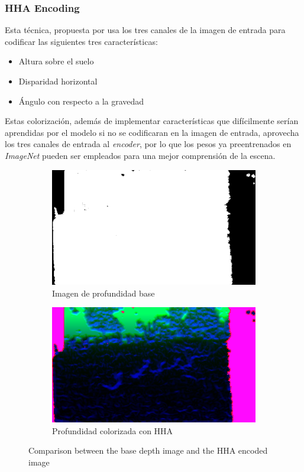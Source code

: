 \documentclass[12pt,a4paper]{report}
\begin{document}
\subsubsection{HHA Encoding}
\label{subsubsec:hha_encoding}
Esta técnica, propuesta por \cite{gupta2014learningrichfeaturesrgbd} usa los tres canales de la imagen de entrada para codificar las siguientes tres características:
\begin{itemize}
    \item Altura sobre el suelo
    \item Disparidad horizontal
    \item Ángulo con respecto a la gravedad
\end{itemize}
Estas colorización, además de implementar características que difícilmente serían aprendidas por el modelo si no se codificaran en la imagen de entrada, aprovecha los tres canales de entrada al \textit{encoder}, por lo que los pesos ya preentrenados en \textit{ImageNet} pueden ser empleados para una mejor comprensión de la escena.
\begin{figure}[!h]
    \centering
    \begin{subfigure}{0.45\textwidth}
        \centering
        \includegraphics[width=\textwidth]{media/data/depth_gueese.png}
        \caption{Imagen de profundidad base}
    \end{subfigure}
    \hfill
    \begin{subfigure}{0.45\textwidth}
        \centering
        \includegraphics[width=\textwidth]{media/data/hha_gueese.png}
        \caption{Profundidad colorizada con HHA}
    \end{subfigure}
    \caption{Comparison between the base depth image and the HHA encoded image}
    \label{fig:depth-hha-comparison}
\end{figure}
\end{document}
